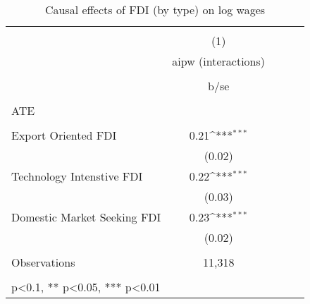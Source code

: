 \begin{table}
	\def\sym#1{\ifmmode^{#1}\else\(^{#1}\)\fi}
	\centering
	\caption{Causal effects of FDI (by type) on log wages}
	\label{4_table2}
	\begin{tabular}{l*{1}{cccc}}
		\hline\hline
		&\multicolumn{1}{c}{}                                        \\
		& (1)   \\
		\
		&aipw (interactions)     \\
		\\
		&b/se       \\
		\hline
		\\
		ATE \\
		\\
		Export Oriented FDI &       0.21\sym{***}   \\
		&     (0.02)        \\
		Technology Intenstive FDI&       0.22\sym{***} \\
		&     (0.03)         \\
		Domestic Market Seeking FDI&       0.23\sym{***}\\
		&     (0.02)   \\
		\hline
		\\
		Observations        & 11,318          
		&                 &            \\
		\hline\hline
		\\
		\small * p<0.1, ** p<0.05, *** p<0.01
	\end{tabular} \\
\end{table}